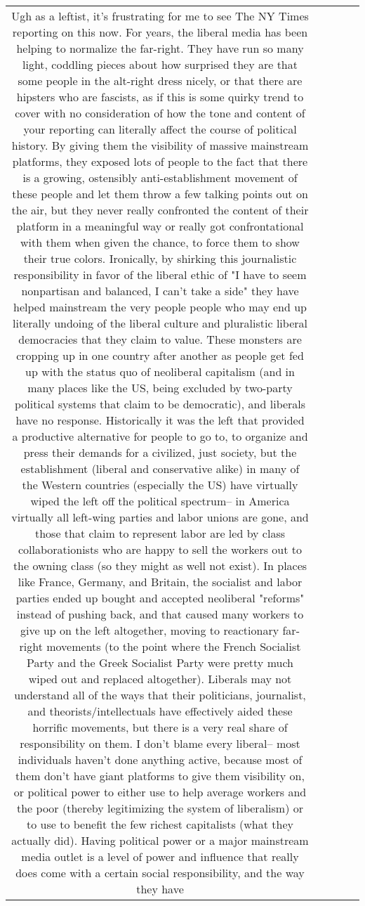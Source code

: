 \documentclass[11pt]{article}
\newlength\mylength
\begin{document}
\begin{center}
\begin{longtable}{|C{.65\mylength}|C{.30\mylength}|C{.12\mylength}|C{.12\mylength}|C{.12\mylength}|}
  \small Ugh as a leftist, it's frustrating for me to see The NY Times reporting on this now. For years, the liberal media has been helping to normalize the far-right. They have run so many light, coddling pieces about how surprised they are that some people in the alt-right dress nicely, or that there are hipsters who are fascists, as if this is some quirky trend to cover with no consideration of how the tone and content of your reporting can literally affect the course of political history. By giving them the visibility of massive mainstream platforms, they exposed lots of people to the fact that there is a growing, ostensibly anti-establishment movement of these people and let them throw a few talking points out on the air, but they never really confronted the content of their platform in a meaningful way or really got confrontational with them when given the chance, to force them to show their true colors. Ironically, by shirking this journalistic responsibility in favor of the liberal ethic of "I have to seem nonpartisan and balanced, I can't take a side" they have helped mainstream the very people people who may end up literally undoing of the liberal culture and pluralistic liberal democracies that they claim to value. These monsters are cropping up in one country after another as people get fed up with the status quo of neoliberal capitalism (and in many places like the US, being excluded by two-party political systems that claim to be democratic), and liberals have no response. Historically it was the left that provided a productive alternative for people to go to, to organize and press their demands for a civilized, just society, but the establishment (liberal and conservative alike) in many of the Western countries (especially the US) have virtually wiped the left off the political spectrum-- in America virtually all left-wing parties and labor unions are gone, and those that claim to represent labor are led by class collaborationists who are happy to sell the workers out to the owning class (so they might as well not exist). In places like France, Germany, and Britain, the socialist and labor parties ended up bought and accepted neoliberal "reforms" instead of pushing back, and that caused many workers to give up on the left altogether, moving to reactionary far-right movements (to the point where the French Socialist Party and the Greek Socialist Party were pretty much wiped out and replaced altogether). Liberals may not understand all of the ways that their politicians, journalist, and theorists/intellectuals have effectively aided these horrific movements, but there is a very real share of responsibility on them. I don't blame every liberal-- most individuals haven't done anything active, because most of them don't have giant platforms to give them visibility on, or political power to either use to help average workers and the poor (thereby legitimizing the system of liberalism) or to use to benefit the few richest capitalists (what they actually did). Having political power or a major mainstream media outlet is a level of power and influence that really does come with a certain social responsibility, and the way they have 
\end{longtable}
\end{center}
\end{document}
